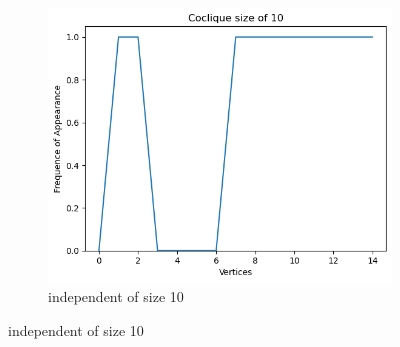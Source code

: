 \documentclass{amsart}
\theoremstyle{definition}
\begin{document}
\begin{appendix}
\begin{figure}[hbt!]
\begin{subfigure}[b]{.45\textwidth}
			\includegraphics[width=1\linewidth]{images/depth_4_size_10.png}
			\caption{independent of size 10}
		\end{subfigure}
	\end{figure}


\end{appendix}
\end{document}
